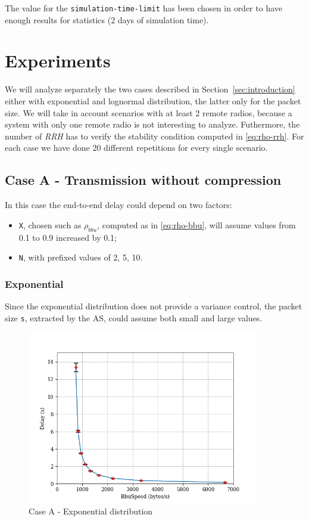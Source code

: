 \documentclass[11pt,a4paper,oneside, openright]{article}
\begin{document}
The value for the \texttt{simulation-time-limit} has been chosen in order to have enough results for statistics (2 days of simulation time).

\section{Experiments}
We will analyze separately the two cases described in Section~\ref{sec:introduction} either with exponential and lognormal distribution, the latter only for the packet size.
We will take in account scenarios with at least 2 remote radios, because a system with only one remote radio is not interesting to analyze. Futhermore, the number of \textit{RRH} has to verify the stability condition computed in \eqref{eq:rho-rrh}. For each case we have done 20 different repetitions for every single scenario.

\subsection{Case A - Transmission without compression}
In this case the end-to-end delay could depend on two factors:
\begin{itemize}
	\item \texttt{X}, chosen such as $ \rho_{bbu} $, computed as in \eqref{eq:rho-bbu}, will assume values from 0.1 to 0.9 increased by 0.1;
	\item \texttt{N}, with prefixed values of 2, 5, 10.
\end{itemize}
\subsubsection{Exponential}
Since the exponential distribution does not provide a variance control, the packet size \texttt{s}, extracted by the AS, could assume both small and large values.

\begin{figure}[h]
	\centering
	\includegraphics[width=0.9\textwidth]{images/case-a-exp}
	\caption{Case A - Exponential distribution}
	\label{fig:exp-a}
\end{figure}
\end{document}
